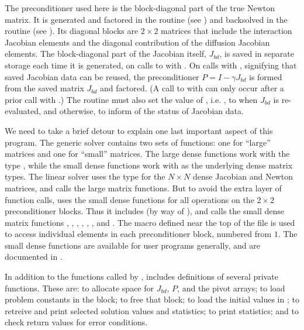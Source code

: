 The preconditioner used here is the block-diagonal part of the true Newton
matrix.  It is generated and factored in the  routine 
(see ) and backsolved in the  routine 
(see ). Its diagonal blocks are $2 \times 2$
matrices that include the interaction Jacobian elements and the diagonal
contribution of the diffusion Jacobian elements.  The block-diagonal part of
the Jacobian itself, $J_{bd}$, is saved in separate storage each time it is
generated, on calls to  with .
On calls with , signifying that saved Jacobian data
can be reused, the preconditioner $P = I - \gamma J_{bd}$ is formed from the
saved matrix $J_{bd}$ and factored.  (A call to  with
 can only occur after a prior call with
.)  The  routine must also set the value
of , i.e. , to  when $J_{bd}$ is re-evaluated,
and  otherwise, to inform {\cvspgmr} of the status of Jacobian data.

We need to take a brief detour to explain one last important aspect of
this program.  The generic {\dense} solver contains two
sets of functions: one for ``large'' matrices and one for ``small''
matrices.  The large dense functions work with the type ,
while the small dense functions work with  as the
underlying dense matrix types.  The {\cvdense} linear solver uses the
type  for the $N \times N$ dense Jacobian and Newton
matrices, and calls the large matrix functions.  But to avoid the
extra layer of function calls,  uses the small dense
functions for all operations on the $2 \times 2$ preconditioner blocks.  
Thus it includes  (by way of ),
and calls the small dense matrix functions , ,
, , , , and .
The macro  defined near the top of the file is used to access
individual elements in each preconditioner block, numbered from $1$.
The small dense functions are available for {\cvode} user programs
generally, and are documented in .

In addition to the functions called by {\cvode},  includes
definitions of several private functions.  These are: 
to allocate space for $J_{bd}$, $P$, and the pivot arrays; 
to load problem constants in the  block;  to free
that block;  to load the initial values in ; 
 to retreive and print selected solution values and
statistics;  to print statistics; and 
to check return values for error conditions.

